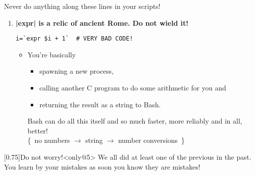 \begin{frame}[fragile]{Never do anything along these lines in your scripts!}
\begin{enumerate}
        \item<only@5>
            \alert{\large\textbf{\bash|expr| is a relic of ancient Rome. Do not wield it!}}
            \begin{lstlisting}[style=MyBash, numbers=none, aboveskip=2mm, xrightmargin=48mm]
                i=`expr $i + 1`  # VERY BAD CODE!
            \end{lstlisting}
            \begin{itemize}
                \item You're basically
                      \begin{itemize}
                          \item spawning a new process,
                          \item calling another C program to do some arithmetic for you and
                          \item returning the result as a string to Bash.
                      \end{itemize}
                      Bash can do all this itself and so much faster, more reliably and in all, better!\\ {\scriptsize\{~no numbers $\to$ string $\to$ number conversions~\}}
            \end{itemize}
    \end{enumerate}
    \begin{varblock}{}[0.75\textwidth]{Do not worry!}<only@5>
        We all did at least one of the previous in the past.\\
        You learn by your mistakes as soon you know they are mistakes!
    \end{varblock}
\end{frame}
